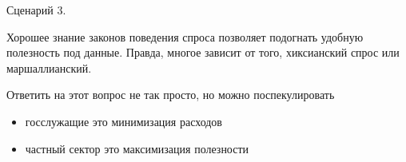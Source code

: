 \documentclass{beamer}
\begin{document}
\begin{frame}{Сценарий 3.}

Хорошее знание законов поведения спроса позволяет подогнать удобную полезность под данные. Правда, многое зависит от того, хиксианский спрос или маршаллианский. 

Ответить на этот вопрос не так просто, но можно поспекулировать

\begin{itemize}
  \item госслужащие это минимизация расходов
  \item частный сектор это максимизация полезности
\end{itemize}

\end{frame}
%
%
%
%
%
%
%
%
%
%
\end{document}
